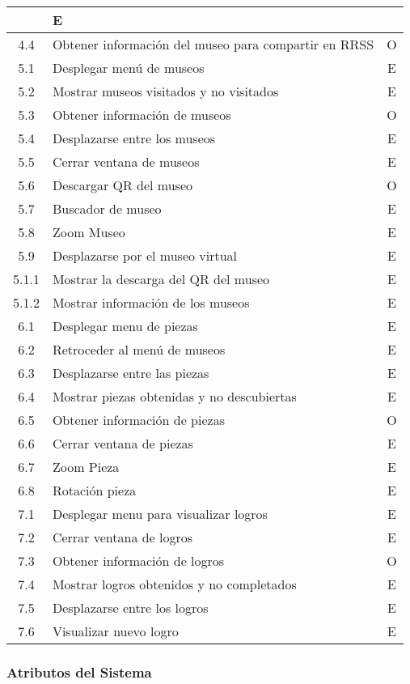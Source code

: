 \begin{longtable}{|c|p{10cm}|c|}
 & E \\ 
\hline 
4.4 & Obtener información del museo para compartir en RRSS & O \\ 
\hline 
5.1 & Desplegar menú de museos & E \\ 
\hline 
5.2 & Mostrar museos visitados y no visitados & E \\ 
\hline 
5.3 & Obtener información de museos & O \\ 
\hline 
5.4 & Desplazarse entre los museos & E \\ 
\hline 
5.5 & Cerrar ventana de museos & E \\ 
\hline 
5.6 & Descargar QR del museo & O \\ 
\hline 
5.7 & Buscador de museo & E \\ 
\hline 
5.8 & Zoom Museo & E \\ 
\hline 
5.9 & Desplazarse por el museo virtual & E \\ 
\hline 
5.1.1 & Mostrar la descarga del QR del museo & E \\ 
\hline 
5.1.2 & Mostrar información de los museos & E \\ 
\hline 
6.1 & Desplegar menu de piezas & E \\ 
\hline 
6.2 & Retroceder al menú de museos & E \\ 
\hline 
6.3 & Desplazarse entre las piezas & E \\ 
\hline 
6.4 & Mostrar piezas obtenidas y no descubiertas & E \\ 
\hline 
6.5 & Obtener información de piezas & O \\ 
\hline 
6.6 & Cerrar ventana de piezas & E \\ 
\hline 
6.7 & Zoom Pieza & E \\ 
\hline 
6.8 & Rotación pieza & E \\ 
\hline 
7.1 & Desplegar menu para visualizar logros & E \\ 
\hline 
7.2 & Cerrar ventana de logros & E \\ 
\hline 
7.3 & Obtener información de logros & O \\ 
\hline 
7.4 & Mostrar logros obtenidos y no completados & E \\ 
\hline 
7.5 & Desplazarse entre los logros & E \\ 
\hline 
7.6 & Visualizar nuevo logro & E \\ 
\hline 
\end{longtable} 

\subsubsection{Atributos del Sistema}

